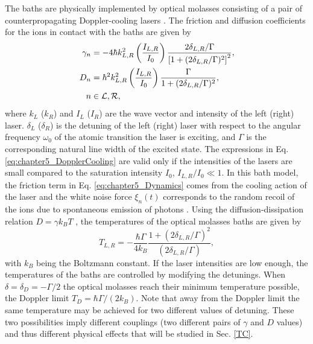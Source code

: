 The baths are physically implemented by optical molasses consisting of a pair of counterpropagating Doppler-cooling lasers \cite{Ruiz2014}. The friction and diffusion coefficients for the ions in contact with the baths are given by \cite{Cohen1992,Metcalf2003,Ruiz2014}
%
\begin{equation}
    \begin{split}
        \gamma_n &= -4 \hbar k_{L,R}^2 \left(\frac{I_{L,R}}{I_0}\right)\frac{2\delta_{L,R}/\Gamma}{\left[1 + (2\delta_{L,R}/\Gamma)^2\right]^2},\\
        D_n &= \hbar^2 k_{L,R}^2 \left(\frac{I_{L,R}}{I_0}\right) \frac{\Gamma}{1 + (2\delta_{L,R}/\Gamma)^2},\\
        n &\in \cal{L},\cal{R},
    \end{split}
    \label{eq:chapter5_DopplerCooling}
\end{equation}
%
where $k_L$ ($k_R$) and $I_L$ ($I_R$) are the wave vector and intensity of the left (right) laser. $\delta_L$ ($\delta_R$) is the detuning of the left (right) laser with respect to the angular frequency $\omega_0$ of the atomic transition the laser is exciting, and $\Gamma$ is the corresponding natural line width of the  excited state. The expressions in Eq. \eqref{eq:chapter5_DopplerCooling} are valid only if the intensities of the lasers are small compared to the saturation intensity $I_0$, $I_{L,R}/I_0\ll 1$. In this bath model, the friction term in Eq. \eqref{eq:chapter5_Dynamics} comes from the cooling action of the laser and the white noise force $\xi_n(t)$ corresponds to the random recoil of the ions due to spontaneous emission of photons \cite{Metcalf2003,Cohen1992}. Using the diffusion-dissipation relation $D = \gamma k_B T $ \cite{Chee2010}, the temperatures of the optical molasses baths are given by
%
\begin{equation}
    T_{L,R} = -\frac{\hbar \Gamma}{4 k_B} \frac{1+(2\delta_{L,R}/\Gamma)^2}{(2\delta_{L,R}/\Gamma)},
    \label{eq:chapter5_Doppler}
\end{equation}
%
with $k_B$ being the Boltzmann constant. If the laser intensities are low enough, the temperatures of the baths are controlled by modifying the detunings. When $\delta = \delta_D=-\Gamma / 2$ the optical molasses reach their minimum temperature possible, the Doppler limit $T_{D} = {\hbar \Gamma}/({2k_B})$. Note that away from the Doppler limit the same temperature may be achieved
for two different values of detuning. These two possibilities imply different couplings (two different pairs of $\gamma$ and $D$ values) and thus different physical effects that will be studied in Sec. \ref{TC}.
%
%
%
%

